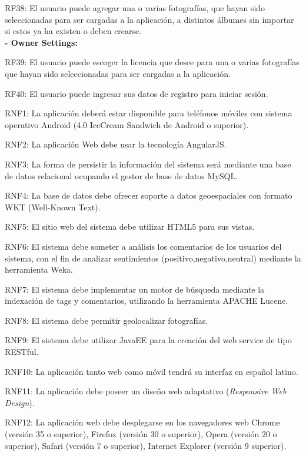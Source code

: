 \documentclass{memoria}
\begin{document}
RF38: El usuario puede agregar una o varias fotografías, que hayan sido seleccionadas para ser cargadas a la aplicación, a distintos álbumes sin importar si estos ya ha existen o deben crearse.\\

\textbf{- Owner Settings:}

RF39: El usuario puede escoger la licencia que desee para una o varias fotografías que hayan sido seleccionadas para ser cargadas a la aplicación.\\


RF40: El usuario puede ingresar sus datos de registro para iniciar sesión.\\

\newpage


RNF1: La aplicación deberá estar disponible para teléfonos móviles con sistema operativo Android (4.0 IceCream Sandwich de Android o superior).

RNF2: La aplicación Web debe usar la tecnología AngularJS.

RNF3: La forma de persistir la información del sistema será mediante una base de datos relacional ocupando el gestor de base de datos MySQL.

RNF4: La base de datos debe ofrecer soporte a datos geoespaciales con formato WKT (Well-Known Text).

RNF5: El sitio web del sistema debe utilizar HTML5 para sus vistas.

RNF6: El sistema debe someter a análisis los comentarios de los usuarios del sistema, con el fin de analizar sentimientos (positivo,negativo,neutral) mediante la herramienta Weka.

RNF7: El sistema debe implementar un motor de búsqueda mediante la indexación de tags y comentarios, utilizando la  herramienta APACHE Lucene.

RNF8: El sistema debe permitir geolocalizar fotografías.

RNF9: El sistema debe utilizar JavaEE para la creación del web service de tipo RESTful.

RNF10: La aplicación tanto web como móvil tendrá su interfaz en español latino.

RNF11: La aplicación debe poseer un diseño web adaptativo (\textsl{Responsive Web Design}).

RNF12: La aplicación web debe desplegarse en los navegadores web Chrome (versión 35 o superior), Firefox (versión 30 o superior), Opera (versión 20 o superior), Safari (versión 7 o superior), Internet Explorer (versión 9 superior).
\end{document}
